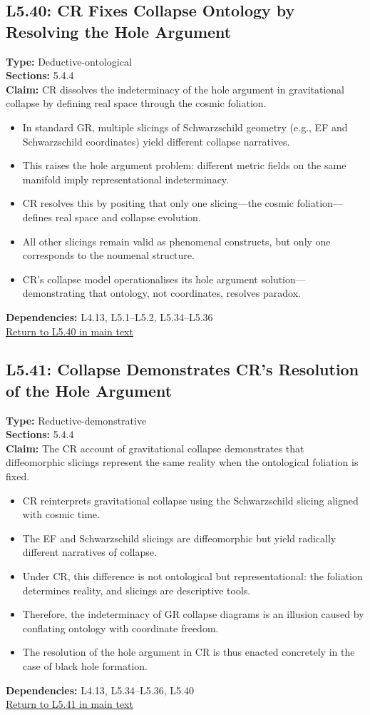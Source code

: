 \documentclass[12pt]{book}
\newcommand{\returnlink}[1]{\hyperref[logic:#1]{Return to #1 in main text}\xspace}
\begin{document}
\subsection*{L5.40: CR Fixes Collapse Ontology by Resolving the Hole Argument}
\label{appendix:L5.40}
\textbf{Type:} Deductive-ontological \\
\textbf{Sections:} 5.4.4 \\
\textbf{Claim:} CR dissolves the indeterminacy of the hole argument in gravitational collapse by defining real space through the cosmic foliation.
\begin{itemize}
  \item In standard GR, multiple slicings of Schwarzschild geometry (e.g., EF and Schwarzschild coordinates) yield different collapse narratives.
  \item This raises the hole argument problem: different metric fields on the same manifold imply representational indeterminacy.
  \item CR resolves this by positing that only one slicing---the cosmic foliation---defines real space and collapse evolution.
  \item All other slicings remain valid as phenomenal constructs, but only one corresponds to the noumenal structure.
  \item CR's collapse model operationalises its hole argument solution---demonstrating that ontology, not coordinates, resolves paradox.
\end{itemize}
\textbf{Dependencies:} L4.13, L5.1–L5.2, L5.34–L5.36 \\
\returnlink{L5.40}

\subsection*{L5.41: Collapse Demonstrates CR's Resolution of the Hole Argument}
\label{appendix:L5.41}
\textbf{Type:} Reductive-demonstrative \\
\textbf{Sections:} 5.4.4 \\
\textbf{Claim:} The CR account of gravitational collapse demonstrates that diffeomorphic slicings represent the same reality when the ontological foliation is fixed.
\begin{itemize}
  \item CR reinterprets gravitational collapse using the Schwarzschild slicing aligned with cosmic time.
  \item The EF and Schwarzschild slicings are diffeomorphic but yield radically different narratives of collapse.
  \item Under CR, this difference is not ontological but representational: the foliation determines reality, and slicings are descriptive tools.
  \item Therefore, the indeterminacy of GR collapse diagrams is an illusion caused by conflating ontology with coordinate freedom.
  \item The resolution of the hole argument in CR is thus enacted concretely in the case of black hole formation.
\end{itemize}
\textbf{Dependencies:} L4.13, L5.34–L5.36, L5.40 \\
\returnlink{L5.41}
\end{document}
